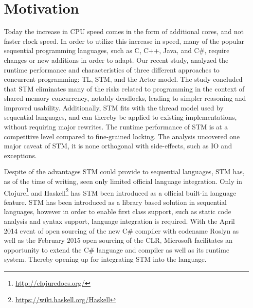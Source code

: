 \makeatletter {}\makeatother
{}
%
\section{Motivation}
Today the increase in \ac{CPU} speed comes in the form of additional cores, and not faster clock speed\cite{sutter2005free}. In order to utilize this increase in speed, many of the popular sequential programming languages, such as C, C++, Java, and C\#, require changes or new additions in order to adapt\cite[p. 56]{sutter2005software}. Our recent study\cite{dpt907e14trending}, analyzed the runtime performance and characteristics of three different approaches to concurrent programming: \ac{TL}, \ac{STM}, and the Actor model. The study concluded that \ac{STM} eliminates many of the risks related to programming in the context of shared-memory concurrency, notably deadlocks, leading to simpler reasoning and improved usability. Additionally, \ac{STM} fits with the thread model used by sequential languages, and can thereby be applied to existing implementations, without requiring major rewrites. The runtime performance of \ac{STM} is at a competitive level compared to fine-grained locking\cite{dpt907e14trending}. The analysis uncovered one major caveat of \ac{STM}, it is none orthogonal with side-effects, such as \ac{IO} and exceptions\cite{dpt907e14trending}.

Despite of the advantages \ac{STM} could provide to sequential languages, \ac{STM} has, as of the time of writing, seen only limited official language integration. Only in Clojure\footnote{\url{http://clojuredocs.org/}} and Haskell\footnote{\url{https://wiki.haskell.org/Haskell}} has \ac{STM} been introduced as a official built-in language feature. \ac{STM} has been introduced as a library based solution in sequential languages, however in order to enable first class support, such as static code analysis and syntax support, language integration is required. With the April 2014 event of open sourcing of the new C\# compiler\cite{roslyn} with codename Roslyn as well as the February 2015 open sourcing of the \ac{CLR}\cite{coreclr}, Microsoft facilitates an opportunity to extend the C\# language and compiler as well as its runtime system. Thereby opening up for integrating \ac{STM} into the language.
